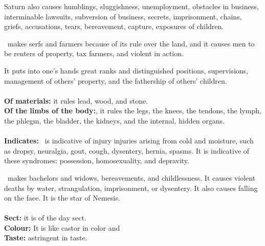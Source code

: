 Saturn also causes humblings, sluggishness, unemployment, obstacles in business, interminable lawsuits, subversion of business, secrets, imprisonment, chains, griefs, accusations, tears, bereavement, capture, exposures of children. 

\Saturn\, makes serfs and farmers because of its rule over the land, and it causes men to be renters of property, tax farmers, and violent in action. 

It puts into one’s hands great ranks and distinguished positions, supervisions, management of others’ property, and the fathership of others’ children. \\
\\
\textbf{Of materials:} it rules lead, wood, and stone. \\
\textbf{Of the limbs of the body:}, it rules the legs, the knees, the tendons, the lymph, the phlegm, the bladder, the kidneys, and the internal, hidden organs. \\
\\
\textbf{Indicates:} \Saturn\, is indicative of injury injuries arising from cold and moisture, such as dropsy, neuralgia, gout, cough, dysentery, hernia, spasms. It is indicative of these syndromes: possession, homosexuality, and depravity. 

\Saturn\, makes bachelors and widows, bereavements, and childlessness. It causes violent deaths by water, strangulation, imprisonment, or dysentery. It also causes falling on the face. It is the star of Nemesis. \\
\\
\textbf{Sect:} it is of the day sect.\\
\textbf{Colour:} It is like castor in color and \\
\textbf{Taste:} astringent in taste.

